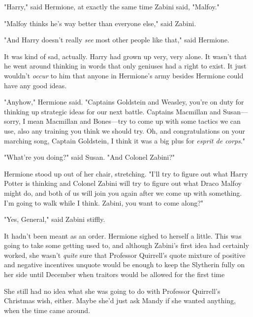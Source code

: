 "Harry," said Hermione, at exactly the same time Zabini said, "Malfoy."

"Malfoy thinks he's way better than everyone else," said Zabini.

"And Harry{\el} doesn't really \emph{see} most other people like that," said
Hermione.

It was kind of sad, actually. Harry had grown up very, very alone. It wasn't
that he went around thinking in words that only geniuses had a right to exist.
It just wouldn't \emph{occur} to him that anyone in Hermione's army besides
Hermione could have any good ideas.

"Anyhow," Hermione said. "Captains Goldstein and Weasley, you're on duty for
thinking up strategic ideas for our next battle. Captains Macmillan and
Susan---sorry, I mean Macmillan and Bones---try to come up with some tactics we
can use, also any training you think we should try. Oh, and congratulations on
your marching song, Captain Goldstein, I think it was a big plus for
\emph{esprit de corps}."

"What're you doing?" said Susan. "And Colonel Zabini?"

Hermione stood up out of her chair, stretching. "I'll try to figure out what
Harry Potter is thinking and Colonel Zabini will try to figure out what Draco
Malfoy might do, and both of us will join you again after we come up with
something. I'm going to walk while I think. Zabini, you want to come along?"

"Yes, General," said Zabini stiffly.

It hadn't been meant as an order. Hermione sighed to herself a little. This was
going to take some getting used to, and although Zabini's first idea had
certainly worked, she wasn't \emph{quite} sure that Professor Quirrell's quote
mixture of positive and negative incentives unquote would be enough to keep the
Slytherin fully on her side until December when traitors would be allowed for
the first time{\el}

She still had no idea what she was going to do with Professor Quirrell's
Christmas wish, either. Maybe she'd just ask Mandy if she wanted anything, when
the time came around.
